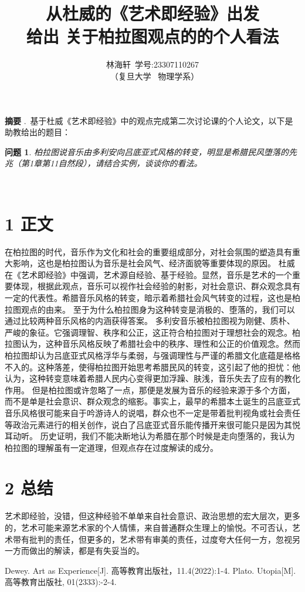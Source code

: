 \documentclass[twocolumn]{ctexart}
\title{从杜威的《艺术即经验》出发\\给出
	关于柏拉图观点的的个人看法}
\author{ 林海轩\ 学号:23307110267 \\\ （复旦大学 \ 物理学系）}
\date{\vspace{-2em}}
\begin{document}
	
	\maketitle
	
	\begin{strip}
		
		\noindent  \textbf{摘要} .\ 基于杜威《艺术即经验》中的观点完成第二次讨论课的个人论文，以下是助教给出的题目：
		\newtheorem*{lemma}{问题}
		\begin{lemma}
			柏拉图说音乐由多利安向吕底亚式风格的转变，明显是希腊民风堕落的先兆（第1章第11自然段），请结合实例，谈谈你的看法。
		\end{lemma}
		
		\leavevmode\\
	\end{strip}
	
	
	\section*{1  正文}
	
	在柏拉图的时代，音乐作为文化和社会的重要组成部分，对社会氛围的塑造具有重大影响，这也是柏拉图认为音乐是社会风气、经济面貌等重要体现的原因。
	杜威在《艺术即经验》中强调，艺术源自经验、基于经验。显然，音乐是艺术的一个重要体现，根据此观点，音乐可以视作社会经验的射影，对社会意识、群众观念具有一定的代表性。希腊音乐风格的转变，暗示着希腊社会风气转变的过程，这也是柏拉图观点的由来。
	至于为什么柏拉图身为这种转变是消极的、堕落的，我们可以通过比较两种音乐风格的内涵获得答案。
	多利安音乐被柏拉图视为刚健、质朴、严峻的象征。它强调理智、秩序和公正，这正符合柏拉图对于理想社会的观念。柏拉图认为，这种音乐风格反映了希腊社会中的秩序、理性和公正的价值观念。然而柏拉图却认为吕底亚式风格浮华与柔弱，与强调理性与严谨的希腊文化底蕴是格格不入的。这种落差，使得柏拉图开始思考希腊民风的转变，这引起了他的担忧：他认为，这种转变意味着希腊人民内心变得更加浮躁、肤浅，音乐失去了应有的教化作用。
	但是柏拉图或许忽略了一点，那便是发展为音乐的经验来源于多个方面，而不是单是社会意识、群众观念的缩影。事实上，最早的希腊本土诞生的吕底亚式音乐风格很可能来自于吟游诗人的说唱，群众也不一定是带着批判视角或社会责任等政治元素进行的相关创作，说白了吕底亚式音乐能传播开来很可能只是因为其悦耳动听。
	历史证明，我们不能决断地认为希腊在那个时候是走向堕落的，我认为柏拉图的理解虽有一定道理，但观点存在过度解读的成分。
	
	
	
	
	\section*{2 总结}
艺术即经验，没错，但这种经验不单单来自社会意识、政治思想的宏大层次，更多的，艺术可能来源艺术家的个人情愫，来自普通群众生理上的愉悦。不可否认，艺术带有批判的责任，但更多的，艺术带有审美的责任，过度夸大任何一方，忽视另一方而做出的解读，都是有失妥当的。




	
	\begin{thebibliography}{99}%
		Dewey. Art as Experience[J]. 高等教育出版社，11.4(2022):1-4.
		Plato. Utopia[M]. 高等教育出版社, 01(2333):-2-4.
	\end{thebibliography}
\end{document}
